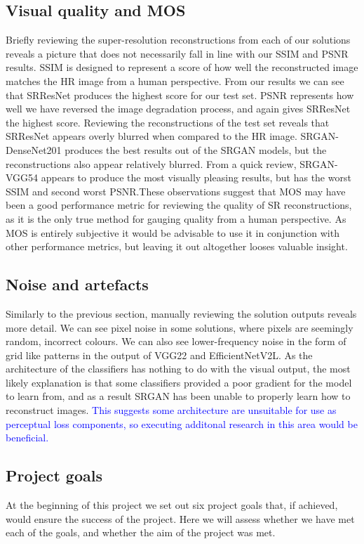 \subsection{Visual quality and MOS}
Briefly reviewing the super-resolution reconstructions from each of our solutions reveals a picture that does not necessarily fall in line with our SSIM and PSNR results. SSIM is designed to represent a score of how well the reconstructed image matches the HR image from a human perspective. From our results we can see that SRResNet produces the highest score for our test set. PSNR represents how well we have reversed the image degradation process, and again gives SRResNet the highest score. Reviewing the reconstructions of the test set reveals that SRResNet appears overly blurred when compared to the HR image. SRGAN-DenseNet201 produces the best results out of the SRGAN models, but the reconstructions also appear relatively blurred. From a quick review, SRGAN-VGG54 appears to produce the most visually pleasing results, but has the worst SSIM and second worst PSNR.\@ These observations suggest that MOS may have been a good performance metric for reviewing the quality of SR reconstructions, as it is the only true method for gauging quality from a human perspective. As MOS is entirely subjective it would be advisable to use it in conjunction with other performance metrics, but leaving it out altogether looses valuable insight.

\subsection{Noise and artefacts}
Similarly to the previous section, manually reviewing the solution outputs reveals more detail. We can see pixel noise in some solutions, where pixels are seemingly random, incorrect colours. We can also see lower-frequency noise in the form of grid like patterns in the output of VGG22 and EfficientNetV2L. As the architecture of the classifiers has nothing to do with the visual output, the most likely explanation is that some classifiers provided a poor gradient for the model to learn from, and as a result SRGAN has been unable to properly learn how to reconstruct images. \textcolor{blue}{This suggests some architecture are unsuitable for use as perceptual loss components, so executing additonal research in this area would be beneficial.}

\subsection{Project goals}
At the beginning of this project we set out six project goals that, if achieved, would ensure the success of the project. Here we will assess whether we have met each of the goals, and whether the aim of the project was met.

